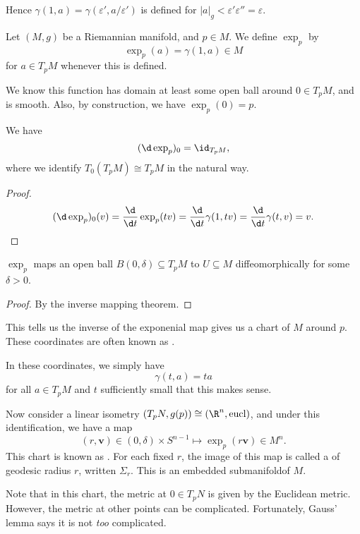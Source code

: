 \documentclass[a4paper]{article}
\begin{document}
Hence $\gamma(1, a) = \gamma(\varepsilon', a/\varepsilon')$ is defined for $|a|_g < \varepsilon' \varepsilon'' = \varepsilon$.

\begin{defi}
  Let $(M, g)$ be a Riemannian manifold, and $p \in M$. We define $\exp_p$ by
  \[
    \exp_p(a) = \gamma(1, a) \in M
  \]
  for $a \in T_p M$ whenever this is defined.
\end{defi}
We know this function has domain at least some open ball around $0 \in T_p M$, and is smooth. Also, by construction, we have $\exp_p(0) = p$.

\begin{prop}
  We have
  \[
    (\d \exp_p)_0 = \id _{T_p M},
  \]
  where we identify $T_0 (T_p M) \cong T_p M$ in the natural way.
\end{prop}

\begin{proof}
   \[
     (\d \exp_p)_0(v) = \frac{\d}{\d t} \exp_p(tv) = \frac{\d}{\d t} \gamma(1, tv) = \frac{\d}{\d t} \gamma(t, v) = v.
   \]
\end{proof}

\begin{cor}
  $\exp_p$ maps an open ball $B(0, \delta) \subseteq T_p M$ to $U \subseteq M$ diffeomorphically for some $\delta > 0$.
\end{cor}

\begin{proof}
  By the inverse mapping theorem.
\end{proof}

This tells us the inverse of the exponenial map gives us a chart of $M$ around $p$. These coordinates are often known as .

In these coordinates, we simply have
\[
  \gamma(t, a) = ta
\]
for all $a \in T_p M$ and $t$ sufficiently small that this makes sense.

Now consider a linear isometry $(T_p N, g(p)) \cong (\R^n, \mathrm{eucl})$, and under this identification, we have a map
\[
  (r, \mathbf{v}) \in (0, \delta) \times S^{n - 1} \mapsto \exp_p (r\mathbf{v}) \in M^n.
\]
This chart is known as . For each fixed $r$, the image of this map is called a  of geodesic radius $r$, written $\Sigma_r$. This is an embedded submanifoldof $M$.

Note that in this chart, the metric at $0 \in T_p N$ is given by the Euclidean metric. However, the metric at other points can be complicated. Fortunately, Gauss' lemma says it is not \emph{too} complicated.
\end{document}
